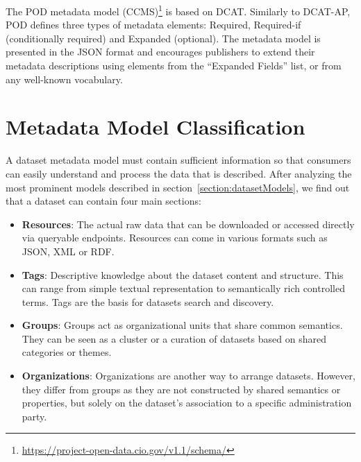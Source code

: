 The POD metadata model (CCMS)\footnote{\url{https://project-open-data.cio.gov/v1.1/schema/}} is based on DCAT. Similarly to DCAT-AP, POD defines three types of metadata elements: Required, Required-if (conditionally required) and Expanded (optional). The metadata model is presented in the JSON format and encourages publishers to extend their metadata descriptions using elements from the ``Expanded Fields'' list, or from any well-known vocabulary.


\section{Metadata Model Classification}
\label{section:harmonized_metadata}
A dataset metadata model must contain sufficient information so that consumers can easily understand and process the data that is described. After analyzing the most prominent models described in section~\ref{section:datasetModels}, we find out that a dataset can contain four main sections:
\begin{itemize}
  \item \textbf{Resources}: The actual raw data that can be downloaded or accessed directly via queryable endpoints. Resources can come in various formats such as JSON, XML or RDF.
  \item \textbf{Tags}: Descriptive knowledge about the dataset content and structure. This can range from simple textual representation to semantically rich controlled terms. Tags are the basis for datasets search and discovery.
  \item \textbf{Groups}: Groups act as organizational units that share common semantics. They can be seen as a cluster or a curation of datasets based on shared categories or themes.
  \item \textbf{Organizations}: Organizations are another way to arrange datasets. However, they differ from groups as they are not constructed by shared semantics or properties, but solely on the dataset's association to a specific administration party.
\end{itemize}

